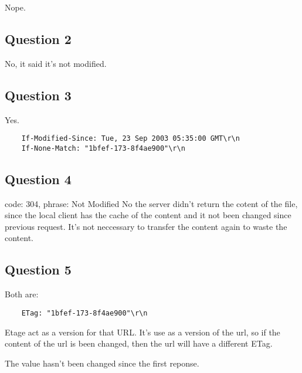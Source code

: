 \documentclass{article}
\begin{document}
Nope.

\subsection{Question 2}

No, it said it's not modified.

\subsection{Question 3}

Yes.
\begin{lstlisting}
    If-Modified-Since: Tue, 23 Sep 2003 05:35:00 GMT\r\n
    If-None-Match: "1bfef-173-8f4ae900"\r\n
\end{lstlisting}

\subsection{Question 4}

code: 304, phrase: Not Modified
No the server didn't return the cotent of the file, since the local client has the cache of the content and it not been changed since previous request. It's not neccessary to transfer the content again to waste the content. 

\subsection{Question 5}

Both are:
\begin{lstlisting}
    ETag: "1bfef-173-8f4ae900"\r\n
\end{lstlisting}

Etage act as a version for that URL. It's use as a version of the url, so if the content of the url is been changed, then the url will have a different ETag. 

The value hasn't been changed since the first reponse.
\end{document}
